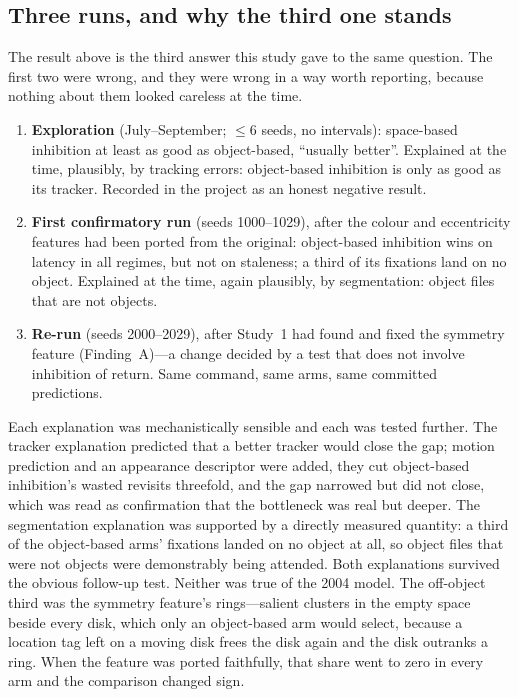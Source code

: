 \documentclass[11pt,a4paper]{article}
\begin{document}
\subsection{Three runs, and why the third one stands}
\label{sec:threeruns}
The result above is the third answer this study gave to the same question. The
first two were wrong, and they were wrong in a way worth reporting, because
nothing about them looked careless at the time.
\begin{enumerate}
  \item \textbf{Exploration} (July--September; $\le6$ seeds, no intervals):
        space-based inhibition at least as good as object-based, ``usually
        better''. Explained at the time, plausibly, by tracking errors: object-based
        inhibition is only as good as its tracker. Recorded in the project as an
        honest negative result.
  \item \textbf{First confirmatory run} (seeds 1000--1029), after the colour and
        eccentricity features had been ported from the original: object-based
        inhibition wins on latency in all regimes, but not on staleness; a third
        of its fixations land on no object. Explained at the time, again
        plausibly, by segmentation: object files that are not objects.
  \item \textbf{Re-run} (seeds 2000--2029), after Study~1 had found and fixed the
        symmetry feature (Finding~A)---a change decided by a test that does not
        involve inhibition of return. Same command, same arms, same committed
        predictions.
\end{enumerate}

Each explanation was mechanistically sensible and each was tested further. The
tracker explanation predicted that a better tracker would close the gap; motion
prediction and an appearance descriptor were added, they cut object-based
inhibition's wasted revisits threefold, and the gap narrowed but did not close,
which was read as confirmation that the bottleneck was real but deeper. The
segmentation explanation was supported by a directly measured quantity: a third
of the object-based arms' fixations landed on no object at all, so object files
that were not objects were demonstrably being attended. Both explanations
survived the obvious follow-up test. Neither was true of the 2004 model. The
off-object third was the symmetry feature's rings---salient clusters in the empty
space beside every disk, which only an object-based arm would select, because a
location tag left on a moving disk frees the disk again and the disk outranks a
ring. When the feature was ported faithfully, that share went to zero in every
arm and the comparison changed sign.
\end{document}
